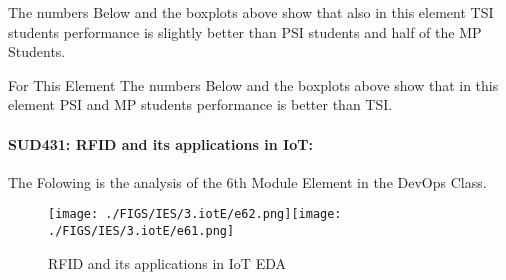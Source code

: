 \documentclass[12pt]{extreport}
\begin{document}
The numbers Below and the boxplots above show that also in this element  TSI students performance is slightly better than PSI students and half of the MP Students.

For This Element The numbers Below and the boxplots above show that in this element  PSI and MP students performance is  better than TSI.

\begin{comment}

\begin{enumerate}	
	\item The MP Class Box-Plot:
	\begin{enumerate}
		\item MAX = a {} {} {} {} {} {} {} {} UQ = b {} {} {} {} {} {} {} {} Median = c
		\item LQ = d {} {} {} {} {} {} {} {}  MIN =	l {} {} {} {} {} {} {} {}  IQR = e - f = g
	\end{enumerate}
	\item The PSI Class Box-Plot:
	\begin{enumerate}
		\item MAX = a {} {} {} {} {} {} {} {} UQ = b {} {} {} {} {} {} {} {} Median = c
		\item LQ = d {} {} {} {} {} {} {} {}  MIN =	e {} {} {} {} {} {} {} {} IQR = f - g = h	
	\end{enumerate}
	\item The TSI Class Box-Plot:
	\begin{enumerate}
		\item MAX = a {} {} {} {} {} {} {} {} UQ = b {} {} {} {} {} {} {} {} Median = c
		\item LQ = d {} {} {} {} {} {} {} {} MIN = e {} {} {} {} {} {} {} {} IQR = f - g = h	
	\end{enumerate}
\end{enumerate}

\end{comment}





\paragraph{\large SUD431: RFID and its applications in IoT:\\
} 
The Folowing is the analysis of the 6th Module Element in the DevOps Class.

\begin{figure}[H]
	\centering
	\texttt{[image: ./FIGS/IES/3.iotE/e62.png]}\texttt{[image: ./FIGS/IES/3.iotE/e61.png]}
	\caption{RFID and its applications in IoT EDA}
	\label{fig:35}
\end{figure}
\end{document}
